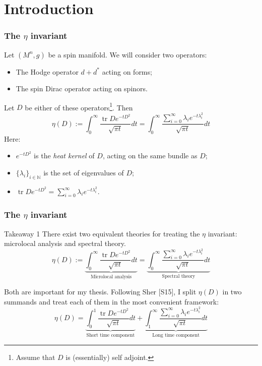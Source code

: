 \documentclass{beamer}
\DeclareMathOperator{\tr}{tr}
\newcommand{\bb}{\mathbb}
\newcommand{\be}{\begin{equation}}
\newcommand{\ee}{\end{equation}}
\begin{document}
\section{Introduction}
\begin{frame}
\frametitle{The $\eta$ invariant}
Let $(M^n,g)$ be a spin manifold. We will consider two operators:
\begin{itemize}
\item The Hodge operator $d+d^*$ acting on forms;
\item The spin Dirac operator acting on spinors.
\end{itemize}
Let $D$ be either of these operators\footnote{Assume that $D$ is (essentially) self adjoint.}. Then
\[
\eta(D):=\int_0^\infty\frac{\tr De^{-tD^2}}{\sqrt{\pi t}}dt=\int_0^\infty\frac{\sum_{i=0}^\infty\lambda_i e^{-t\lambda_i^2}}{\sqrt{\pi t}}dt
\]
Here:
\begin{itemize}
\item $e^{-tD^2}$ is the \emph{heat kernel} of $D$, acting on the same bundle as $D$;
\item $\{\lambda_i\}_{i\in\bb N}$ is the set of eigenvalues of $D$;
\item $\tr De^{-tD^2}=\sum_{i=0}^\infty\lambda_i e^{-t\lambda_i^2}$.
\end{itemize}
\end{frame}



\begin{frame}
\frametitle{The $\eta$ invariant}
\begin{alertblock}{Takeaway 1}
There exist two equivalent theories for treating the $\eta$ invariant: microlocal analysis and spectral theory.
\be
\eta(D):=\underbrace{\int_0^\infty\frac{\tr De^{-tD^2}}{\sqrt{\pi t}}dt}_{\text{Microlocal analysis}}=\underbrace{\int_0^\infty\frac{\sum_{i=0}^\infty\lambda_i e^{-t\lambda_i^2}}{\sqrt{\pi t}}dt}_{\text{Spectral theory}}
\ee
\end{alertblock}
Both are important for my thesis. Following Sher [S15], I split $\eta(D)$ in two summands and treat each of them in the most convenient framework:
\[
\eta(D)=\underbrace{\int_0^1\frac{\tr De^{-tD^2}}{\sqrt{\pi t}}dt}_{\text{Short time component}}+\underbrace{\int_1^\infty\frac{\sum_{i=0}^\infty\lambda_i e^{-t\lambda_i^2}}{\sqrt{\pi t}}dt}_{\text{Long time component}}
\]
\end{frame}
\end{document}
